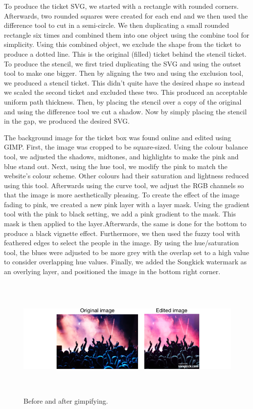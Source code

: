 \documentclass[10pt]{article}
\begin{document}
                To produce the ticket SVG, we started with a rectangle with rounded corners. Afterwards, two rounded squares were created for each end and we then used the difference tool to cut in a semi-circle. We then duplicating a small rounded rectangle six times and combined them into one object using the combine tool for simplicity. Using this combined object, we exclude the shape from the ticket to produce a dotted line. This is the original (filled) ticket behind the stencil ticket. To produce the stencil, we first tried duplicating the SVG and using the outset tool to make one bigger. Then by aligning the two and using the exclusion tool, we produced a stencil ticket. This didn't quite have the desired shape so instead we scaled the second ticket and excluded these two. This produced an acceptable uniform path thickness. Then, by placing the stencil over a copy of the original and using the difference tool we cut a shadow. Now by simply placing the stencil in the gap, we produced the desired SVG. 


                The background image for the ticket box was found online and edited using GIMP. First, the image was cropped to be square-sized. Using the colour balance tool, we adjusted the shadows, midtones, and highlights to make the pink and blue stand out. Next, using the hue tool, we modify the pink to match the website's colour scheme. Other colours had their saturation and lightness reduced using this tool. Afterwards using the curve tool, we adjust the RGB channels so that the image is more aesthetically pleasing. To create the effect of the image fading to pink, we created a new pink layer with a layer mask. Using the gradient tool with the pink to black setting, we add a pink gradient to the mask. This mask is then applied to the layer.Afterwards, the same is done for the bottom to produce a black vignette effect. Furthermore, we then used the fuzzy tool with feathered edges to select the people in the image. By using the hue/saturation tool, the blues were adjusted to be more grey with the overlap set to a high value to consider overlapping hue values. Finally, we added the Songkick watermark as an overlying layer, and positioned the image in the bottom right corner.

                \begin{figure}[!ht]
                  \centering
                      \includegraphics[height=60mm]{example2.png}
                  \caption{Before and after gimpifying.}
                \end{figure}
\end{document}
